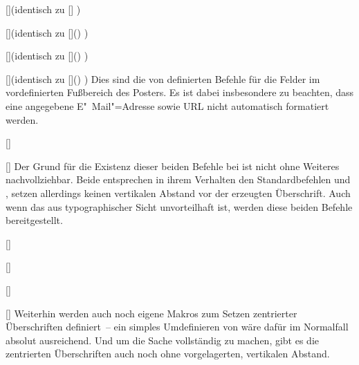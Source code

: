 \begin{Entity*}{}
\begin{Declaration}{[]}(identisch zu 
  []%
)
\begin{Declaration}{[]}(identisch zu 
  []()%
)
\begin{Declaration}{[]}(identisch zu 
  []()%
)
\begin{Declaration}{[]}(identisch zu 
  []()%
)
\printdeclarationlist%
%
Dies sind die von  definierten Befehle für die Felder im 
vordefinierten Fußbereich des Posters. Es ist dabei insbesondere zu beachten, 
dass eine angegebene E"~Mail"=Adresse sowie URL nicht automatisch formatiert 
werden.
\end{Declaration}
\end{Declaration}
\end{Declaration}
\end{Declaration}

\begin{Declaration}{%
  []%
}
\begin{Declaration}{%
  []%
}
\printdeclarationlist%
%
Der Grund für die Existenz dieser beiden Befehle bei  ist 
nicht ohne Weiteres nachvollziehbar. Beide entsprechen in ihrem Verhalten den 
Standardbefehlen  und , setzen allerdings 
keinen vertikalen Abstand vor der erzeugten Überschrift. Auch wenn das aus 
typographischer Sicht unvorteilhaft ist, werden diese beiden Befehle 
bereitgestellt.
\end{Declaration}
\end{Declaration}

\begin{Declaration}{%
  []%
}
\begin{Declaration}{%
  []%
}
\begin{Declaration}{%
  []%
}
\begin{Declaration}{%
  []%
}
\printdeclarationlist%
%
Weiterhin werden auch noch eigene Makros zum Setzen zentrierter Überschriften 
definiert~-- ein simples Umdefinieren von  wäre dafür im 
Normalfall absolut ausreichend. Und um die Sache vollständig zu machen, gibt es 
die zentrierten Überschriften auch noch ohne vorgelagerten, vertikalen Abstand.
\end{Declaration}
\end{Declaration}
\end{Declaration}
\end{Declaration}


\end{Entity*}
